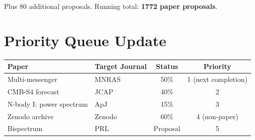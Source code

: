 \documentclass[11pt,a4paper]{article}
\begin{document}
Plus 80 additional proposals. Running total: \textbf{1772 paper proposals}.

\section{Priority Queue Update}

\begin{center}
\begin{tabular}{llcc}
\toprule
\textbf{Paper} & \textbf{Target Journal} & \textbf{Status} & \textbf{Priority} \\
\midrule
Multi-messenger & MNRAS & 50\% & 1 (next completion) \\
CMB-S4 forecast & JCAP & 40\% & 2 \\
N-body I: power spectrum & ApJ & 15\% & 3 \\
Zenodo archive & Zenodo & 60\% & 4 (non-paper) \\
Bispectrum & PRL & Proposal & 5 \\
\bottomrule
\end{tabular}
\end{center}
\end{document}
